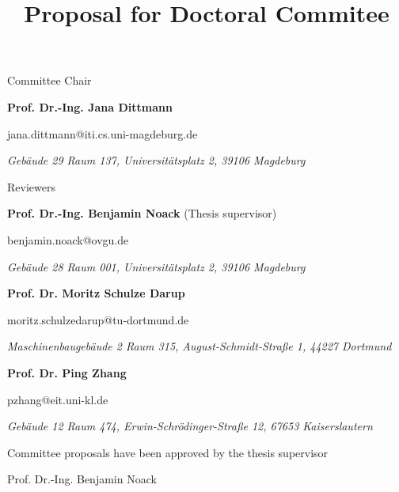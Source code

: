 \documentclass{article}
\title{Proposal for Doctoral Commitee}
\author{}
\date{}
\begin{document}
\maketitle
\thispagestyle{empty}

\begin{center}
    \vspace{\baselineskip}
    \Large
    Committee Chair
    \vspace{\baselineskip}
\end{center}
\normalsize
\textbf{Prof. Dr.-Ing. Jana Dittmann}

\vspace{0.5\baselineskip}
jana.dittmann@iti.cs.uni-magdeburg.de

\vspace{0.5\baselineskip}
\textit{Gebäude 29 Raum 137, Universitätsplatz 2, 39106 Magdeburg}


\begin{center}
    \vspace{\baselineskip}
    \Large
    Reviewers
    \vspace{\baselineskip}
\end{center}
\normalsize
\textbf{Prof. Dr.-Ing. Benjamin Noack} (Thesis supervisor)

\vspace{0.5\baselineskip}
benjamin.noack@ovgu.de

\vspace{0.5\baselineskip}
\textit{Gebäude 28 Raum 001, Universitätsplatz 2, 39106 Magdeburg}

\vspace{2\baselineskip}
\textbf{Prof. Dr. Moritz Schulze Darup}

\vspace{0.5\baselineskip}
moritz.schulzedarup@tu-dortmund.de

\vspace{0.5\baselineskip}
\textit{Maschinenbaugebäude 2 Raum 315, August-Schmidt-Straße 1, 44227 Dortmund}

\vspace{2\baselineskip}
\textbf{Prof. Dr. Ping Zhang}

\vspace{0.5\baselineskip}
pzhang@eit.uni-kl.de

\vspace{0.5\baselineskip}
\textit{Gebäude 12 Raum 474, Erwin-Schrödinger-Straße 12, 67653 Kaiserslautern}


\vfill
Committee proposals have been approved by the thesis supervisor

\vspace{3cm}
Prof. Dr.-Ing. Benjamin Noack
\end{document}
